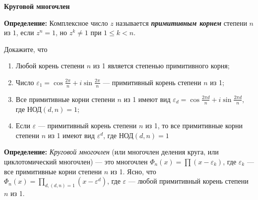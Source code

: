 \documentclass{article}
\begin{document}
    \large

    \begin{center}
        \textbf{Круговой многочлен}
    \end{center}

    \textbf{Определение:} Комплексное число $z$ называется \textbf{\textit{примитивным корнем}} степени $n$
    из $1$, если $z^n = 1$, но $z^k \neq 1$ при $1 \leqslant k < n$.

    \begin{enumerate_boxed}
        \item Докажите, что
        \begin{enumerate}
            \item Любой корень степени $n$ из 1 является степенью примитивного корня;
            \item Число $\varepsilon_1 = \cos\frac{2\pi}{n} + i\sin\frac{2\pi}{n}$ --- примитивный корень степени $n$ из 1;
            \item Все примитивные корни степени $n$ из 1 имеют вид $\varepsilon_d = \cos\frac{2\pi d}{n} + i\sin\frac{2\pi d}{n}$, где НОД$(d,n) = 1$;
            \item Если $\varepsilon$ --- примитивный корень степени $n$ из 1, то все примитивные корни степени $n$ из 1 имеют вид $\varepsilon^d$, где НОД$(d,n) = 1$
        \end{enumerate}
    \end{enumerate_boxed}

    \textbf{Определение:} \textit{Круговой многочлен} (или многочлен деления круга, или циклотомический многочлен) --- это многочлен $\Phi_n(x) = \prod (x - \varepsilon_k)$, где $\varepsilon_k$ --- все примитивные корни степени $n$ из 1.
    Ясно, что $\Phi_n(x) = \prod\limits_{d,(d,n) = 1} (x-\varepsilon^d)$, где $\varepsilon$ --- любой примитивный корень степени $n$ из 1.
\end{document}
